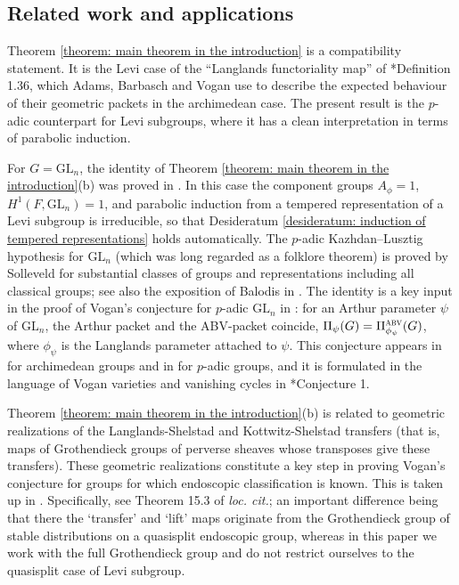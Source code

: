 \documentclass[11pt,letterpaper]{amsart}
\newcommand{\GL}{\mathrm{GL}}
\newcommand{\ABV}{{\mbox{\raisebox{0pt}{\scalebox{0.6}{$\mathrm{ABV}$}}}}}
\renewcommand{\1}{\mathbbm{1}}
\numberwithin{equation}{section}
\begin{document}
\subsection{Related work and applications}
Theorem \ref{theorem: main theorem in the introduction} is a compatibility statement. It is the Levi case of the ``Langlands functoriality map'' of \cite{ABV92}*{Definition 1.36}, which Adams, Barbasch and Vogan use to describe the expected behaviour of their geometric packets in the archimedean case. The present result is the $p$-adic counterpart for Levi subgroups, where it has a clean interpretation in terms of parabolic induction.

For $G=\GL_n$, the identity of Theorem \ref{theorem: main theorem in the introduction}(b) was proved in \cite{CunninghamRayVoganGLn}. In this case the component groups $A_\phi=1$, $H^1(F,\GL_n)=1$, and parabolic induction from a tempered representation of a Levi subgroup is irreducible, so that Desideratum \ref{desideratum: induction of tempered representations} holds automatically. The $p$-adic Kazhdan--Lusztig hypothesis for $\GL_n$ (which was long regarded as a folklore theorem) is proved by Solleveld \cite{Sol25} for substantial classes of groups and representations including all classical groups; see also the exposition of Balodis in \cite{balodis2026proofpadickazhdanlusztighypothesis}. The identity is a key input in the proof of Vogan's conjecture for $p$-adic $\GL_n$ in \cite{CunninghamRayVoganGLn}: for an Arthur parameter $\psi$ of $\GL_n$, the Arthur packet and the ABV-packet coincide, $\Pi_\psi(G)=\Pi^\ABV_{\phi_\psi}(G)$, where $\phi_\psi$ is the Langlands parameter attached to $\psi$. This conjecture appears in \cite{ABV92} for archimedean groups and in \cite{Vog93} for $p$-adic groups, and it is formulated in the language of Vogan varieties and vanishing cycles in \cite{CFMMX22}*{Conjecture 1}.

Theorem \ref{theorem: main theorem in the introduction}(b) is related to geometric realizations of the Langlands-Shelstad and Kottwitz-Shelstad transfers (that is, maps of Grothendieck groups of perverse sheaves whose transposes give these transfers). These geometric realizations constitute a key step in proving Vogan's conjecture for groups for which endoscopic classification is known. This is taken up in \cite{CHLLRX26}. Specifically, see Theorem 15.3 of \textit{loc. cit.}; an important difference being that there the `transfer' and `lift' maps originate from the Grothendieck group of stable distributions on a quasisplit endoscopic group, whereas in this paper we work with the full Grothendieck group and do not restrict ourselves to the quasisplit case of Levi subgroup. 
\end{document}
